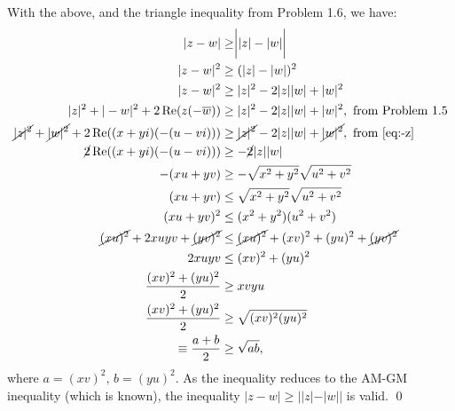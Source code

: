 \documentclass[a4paper, titlepage, DIV=14]{scrartcl}
\begin{document}
\begin{enumerate}
\begin{enumerate}[i)]
            With the above, and the triangle inequality from Problem 1.6, we have:
            \begin{align*}
                |z-w| &\geq \biggr||z|-|w|\biggr| \\
                |z-w|^{2} &\geq (|z|-|w|)^{2} \\
                |z-w|^{2} &\geq |z|^{2} - 2|z||w| + |w|^{2} \\
                |z|^{2} + |-w|^{2} + 2\Re(z(-\overline{w})) 
                    &\geq |z|^{2} - 2|z||w| + |w|^{2}, \text{ from Problem 1.5}\\
                \cancel{|z|^{2}} + \cancel{|w|^{2}} + 2\Re((x+yi)(-(u-vi))) 
                    &\geq \cancel{|z|^{2}} - 2|z||w| + \cancel{|w|^{2}}, \text{ from \autoref{eq:-z}} \\
                \cancel{2}\Re((x+yi)(-(u-vi))) &\geq - \cancel{2}|z||w| \\
                -(xu+yv) &\geq -\sqrt{x^{2}+y^{2}}\sqrt{u^{2}+v^{2}} \\
                (xu+yv) &\leq \sqrt{x^{2}+y^{2}}\sqrt{u^{2}+v^{2}} \\
                (xu+yv)^{2} &\leq (x^{2}+y^{2})(u^{2}+v^{2}) \\
                \cancel{(xu)^{2}} + 2xuyv + \cancel{(yv)^{2}} &\leq \cancel{(xu)^{2}} 
                    + (xv)^{2} + (yu)^{2} + \cancel{(yv)^{2}} \\
                2xuyv &\leq (xv)^{2} + (yu)^{2} \\
                \frac{(xv)^{2}+(yu)^{2}}{2} &\geq xvyu \\
                \frac{(xv)^{2}+(yu)^{2}}{2} &\geq \sqrt{(xv)^{2}(yu)^{2}} \\
                \equiv \frac{a+b}{2} &\geq \sqrt{ab}, 
            \end{align*}where $a=(xv)^{2}, \, b=(yu)^{2}$. As the inequality reduces to the
            AM-GM inequality (which is known), the inequality $|z-w|\geq||z|-|w||$ 
            is valid. \qed \\
        \end{enumerate}


\end{enumerate}
\end{document}
